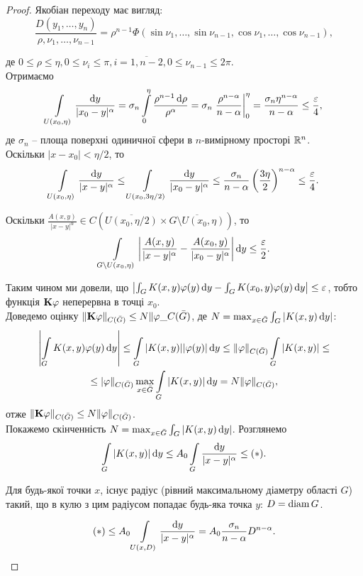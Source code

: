 \begin{proof}
	Якобіан переходу має вигляд:
	\[ \dfrac{D(y_1, \ldots, y_n)}{\rho, \nu_1, \ldots, \nu_{n - 1}} = \rho^{n - 1} \Phi(\sin \nu_1, \ldots, \sin \nu_{n - 1}, \cos \nu_1, \ldots, \cos \nu_{n - 1}), \]

	де $0 \le \rho \le \eta, 0 \le \nu_i \le \pi, i = \overline{1, n - 2}, 0 \le \nu_{n - 1} \le 2 \pi$. \\

	Отримаємо \[ \Int_{U(x_0, \eta)} \dfrac{\diff y}{|x_0 - y|^\alpha} = \sigma_n \Int_0^\eta \dfrac{\rho^{n - 1} \diff \rho}{\rho^\alpha} = \sigma_n \left.\dfrac{\rho^{n - \alpha}}{n - \alpha}\right|_0^\eta = \dfrac{\sigma_n \eta^{n - \alpha}}{n - \alpha} \le \dfrac{\epsilon}{4}, \]
	де $\sigma_n$ -- площа поверхні одиничної сфери в $n$-вимірному просторі $\RR^n$. \\

	Оскільки $|x - x_0| < \eta / 2$, то \[ \Int_{U(x_0, \eta)} \dfrac{\diff y}{|x - y|^\alpha} \le \Int_{U(x_0, 3\eta/2)} \dfrac{\diff y}{|x_0 - y|^\alpha} \le \dfrac{\sigma_n}{n - \alpha} \left(\dfrac{3\eta}{2}\right)^{n - \alpha} \le \dfrac{\epsilon}{4}. \] 

	Оскільки $\frac{A(x, y)}{|x - y|^\alpha} \in C\left(\overline{U (x_0, \eta/2)}\times\overline{G \setminus U (x_0, \eta)}\right)$, то
	\[ \Int_{G \setminus U(x_0, \eta)} \left|\dfrac{A(x, y)}{|x - y|^\alpha} - \dfrac{A(x_0, y)}{|x_0 - y|^\alpha}\right| \diff y \le \dfrac{\epsilon}{2}. \]

	Таким чином ми довели, що $\left| \int_G K(x, y) \phi(y) \diff y - \int_G K(x_0, y) \phi(y) \diff y \right| \le \epsilon$, тобто функція $\bf{K}\phi$ неперервна в точці $x_0$. \\

	Доведемо оцінку $\| \bf{K}\phi \|_{C(\bar G)} \le N \|\phi\_{C(\bar G)}$, де $N = \max_{x \in \bar G} \int_G |K(x, y) \diff y|$:
	\begin{multline*}
		\left| \Int_G K(x, y) \phi(y) \diff y \right| \le \Int_G |K(x, y)| |\phi(y)| \diff y \le \|\phi\|_{C(\bar G)} \Int_G |K(x, y)| \le \\
		\le |\phi\|_{C(\bar G)} \Max_{x \in \bar G} \Int_G |K(x, y)| \diff y = N \|\phi\|_{C(\bar G)},
	\end{multline*}
	отже $\| \bf{K}\phi \|_{C(\bar G)} \le N \|\phi\|_{C(\bar G)}$. \\

	Покажемо скінченність $N = \max_{x \in \bar G} \int_G |K(x, y) \diff y|$. Розглянемо \[\Int_G |K(x,y)| \diff y \le A_0 \Int_G \dfrac{\diff y}{|x - y|^\alpha} \le (*).\]

	Для будь-якої точки $x$, існує радіус (рівний максимальному діаметру області $G$) такий, що в кулю з цим радіусом попадає будь-яка точка $y$: $D = \diam G$.

	\[ (*) \le A_0 \Int_{U(x, D)} \dfrac{\diff y}{|x - y|^\alpha} = A_0 \dfrac{\sigma_n}{n - \alpha} D^{n - \alpha}. \]
\end{proof}

